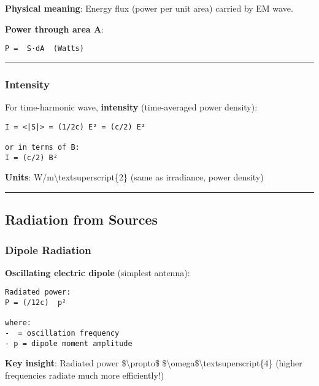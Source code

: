 \textbf{Physical meaning}: Energy flux (power per unit area) carried by
EM wave.

\textbf{Power through area A}:

\begin{verbatim}
P =  S·dA  (Watts)
\end{verbatim}

\begin{center}\rule{0.5\linewidth}{0.5pt}\end{center}

\subsubsection{Intensity}\label{intensity}

For time-harmonic wave, \textbf{intensity} (time-averaged power
density):

\begin{verbatim}
I = <|S|> = (1/2c) E² = (c/2) E²

or in terms of B:
I = (c/2) B²
\end{verbatim}

\textbf{Units}: W/m\textbackslash textsuperscript\{2\} (same as
irradiance, power density)

\begin{center}\rule{0.5\linewidth}{0.5pt}\end{center}

\subsection{\texorpdfstring{ Radiation from
Sources}{ Radiation from Sources}}\label{radiation-from-sources}

\subsubsection{Dipole Radiation}\label{dipole-radiation}

\textbf{Oscillating electric dipole} (simplest antenna):

\begin{verbatim}
Radiated power:
P = (/12c)  p²

where:
-  = oscillation frequency
- p = dipole moment amplitude
\end{verbatim}

\textbf{Key insight}: Radiated power \$\textbackslash propto\$
\$\textbackslash omega\$\textbackslash textsuperscript\{4\} (higher
frequencies radiate much more efficiently!)

